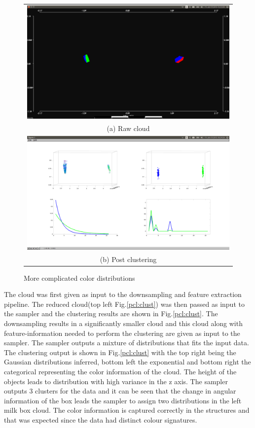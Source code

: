 \documentclass[twoside,hidelinks]{article}
\begin{document}
\begin{figure}
\begin{tabular}{c}
  \includegraphics[width=1\textwidth]{clusterings/coloursSource} \\
  (a) Raw cloud  \\
   \includegraphics[width=1\textwidth]{clusterings/coloursCorrect} \\
 (b) Post clustering \\[6pt]
\end{tabular}
\caption{More complicated color distributions}
  \label{pcl:clust2}
\end{figure}

The cloud was first given as input to the downsampling and feature extraction pipeline. The reduced cloud(top left Fig.\ref{pcl:clust}) was then passed as input to the sampler and the clustering results are shown in Fig.\ref{pcl:clust}. The downsampling results in a significantly smaller cloud and this cloud along with feature-information needed to perform the clustering are given as input to the sampler. The sampler outputs a mixture of distributions that fits the input data. The clustering output is shown in Fig.\ref{pcl:clust} with the top right being the Gaussian distributions inferred, bottom left the exponential and bottom right the categorical representing the color information of the cloud. The height of the objects leads to distribution with high variance in the z axis. The sampler outputs 3 clusters for the data and it can be seen that the change in angular information of the box leads the sampler to assign two distributions in the left milk box cloud. The color information is captured correctly in the structures and that was expected since the data had distinct colour signatures.
\end{document}
